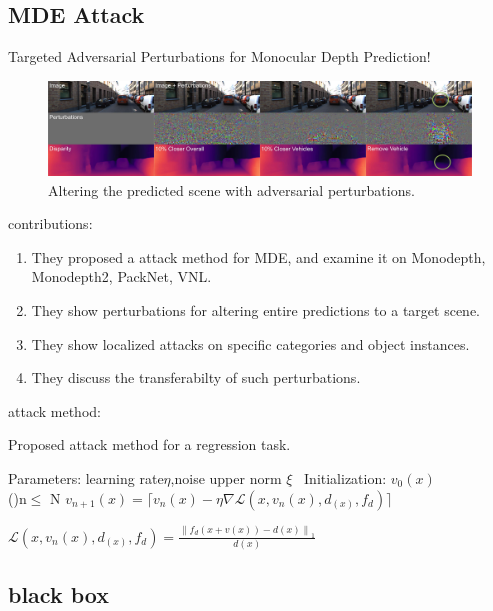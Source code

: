 \documentclass[10pt]{beamer}
\begin{document}
\subsection{MDE Attack}
\begin{frame}
  Targeted Adversarial Perturbations for Monocular Depth Prediction!\cite{nipsmdeattack}\\
  \begin{figure}
  \centering
  \includegraphics[width=1\linewidth]{figure/Targeted Adversarial Perturbations for Monocular Depth Prediction_NIPS2020.jpg}
  \caption{Altering the predicted scene with adversarial perturbations.}
  \end{figure}
  contributions:
  \begin{enumerate}
    \item They proposed a attack method for MDE, and examine it on
    Monodepth, Monodepth2, PackNet, VNL.
    \item They show perturbations for altering entire predictions to a target
    scene.
    \item They show localized attacks on specific categories and object instances.
    \item They discuss the transferabilty of such perturbations.
  \end{enumerate}
\end{frame}

\begin{frame}
  attack method:
  \begin{algorithm}[H]
    \caption{Proposed attack method for a regression task.}
    \label{alg:attack mde}
    Parameters: learning rate$\eta $,noise upper norm $\xi $\;
    \
    Initialization: $v_0(x)$\\
    \For(){n$\le$ N}{
      $v_{n+1}(x)=\lceil v_n(x) - \eta \nabla \mathcal{L}(x, v_n(x), d_{(x)}, f_d)\rceil $
    }
\end{algorithm}
 $\mathcal{L}(x, v_n(x), d_{(x)}, f_d) = \frac{\left\lVert f_d(x+v(x))-d(x)\right\rVert_1 }{d(x)}$ 
\end{frame}
\subsection{black box}
  
\end{document}
